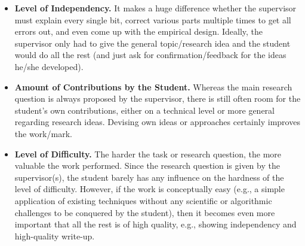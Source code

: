 \begin{itemize}
  \item \textbf{Level of Independency.} It makes a huge difference whether the supervisor must explain every single bit, correct various parts multiple times to get all errors out, and even come up with the empirical design. Ideally, the supervisor only had to give the general topic/research idea and the student would do all the rest (and just ask for confirmation/feedback for the ideas he/she developed).
  \item \textbf{Amount of Contributions by the Student.} Whereas the main research question is always proposed by the supervisor, there is still often room for the student's own contributions, either on a technical level or more general regarding research ideas. Devising own ideas or approaches certainly improves the work/mark.
  \item \textbf{Level of Difficulty.} The harder the task or research question, the more valuable the work performed. Since the research question is given by the supervisor(s), the student barely has any influence on the hardness of the level of difficulty. However, if the work is conceptually easy (e.g., a simple application of existing techniques without any scientific or algorithmic challenges to be conquered by the student), then it becomes even more important that all the rest is of high quality, e.g., showing independency and high-quality write-up.
\end{itemize}
